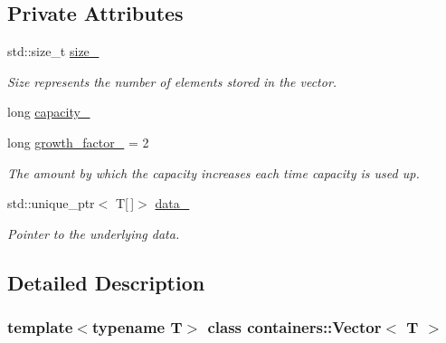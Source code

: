 \subsection*{Private Attributes}
\begin{DoxyCompactItemize}
\item 
\mbox{\label{classcontainers_1_1_vector_af66e2aa22b515344eb78c8ef50bff0ed}} 
std\+::size\+\_\+t \hyperlink{classcontainers_1_1_vector_af66e2aa22b515344eb78c8ef50bff0ed}{size\+\_\+}
\begin{DoxyCompactList}\small\item\em Size represents the number of elements stored in the vector. \end{DoxyCompactList}\item 
long \hyperlink{classcontainers_1_1_vector_a96dab5062859bbed7a88930c7df5d33f}{capacity\+\_\+}
\item 
\mbox{\label{classcontainers_1_1_vector_a836e2b739f42cebe41a00e1f61568877}} 
long \hyperlink{classcontainers_1_1_vector_a836e2b739f42cebe41a00e1f61568877}{growth\+\_\+factor\+\_\+} = 2
\begin{DoxyCompactList}\small\item\em The amount by which the capacity increases each time capacity is used up. \end{DoxyCompactList}\item 
\mbox{\label{classcontainers_1_1_vector_a714ff57d44842fb1a30619ba81510b99}} 
std\+::unique\+\_\+ptr$<$ T\mbox{[}$\,$\mbox{]}$>$ \hyperlink{classcontainers_1_1_vector_a714ff57d44842fb1a30619ba81510b99}{data\+\_\+}
\begin{DoxyCompactList}\small\item\em Pointer to the underlying data. \end{DoxyCompactList}\end{DoxyCompactItemize}


\subsection{Detailed Description}
\subsubsection*{template$<$typename T$>$\newline
class containers\+::\+Vector$<$ T $>$}

